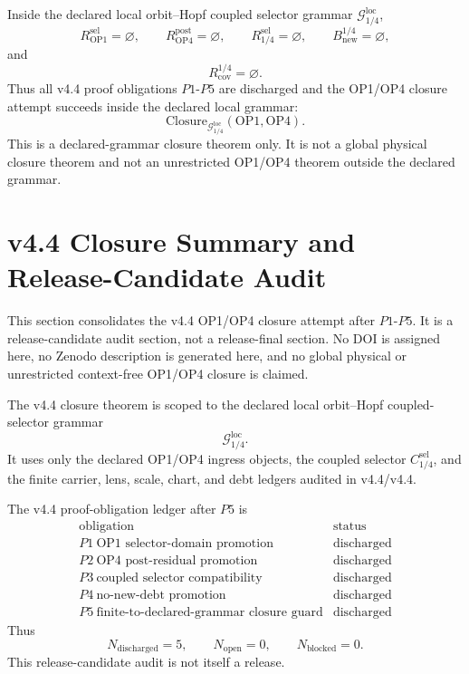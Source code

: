 \begin{theorem}
Inside the declared local orbit--Hopf coupled selector grammar
\(\mathcal G_{1/4}^{\mathrm{loc}}\),
\[
    R_{\mathrm{OP1}}^{\mathrm{sel}}=\varnothing,\qquad
    R_{\mathrm{OP4}}^{\mathrm{post}}=\varnothing,\qquad
    R_{1/4}^{\mathrm{sel}}=\varnothing,\qquad
    B_{\mathrm{new}}^{1/4}=\varnothing,
\]
and
\[
    R_{\mathrm{cov}}^{1/4}=\varnothing.
\]
Thus all v4.4 proof obligations \(P1\)-\(P5\) are discharged and the OP1/OP4
closure attempt succeeds inside the declared local grammar:
\[
    \mathrm{Closure}_{\mathcal G_{1/4}^{\mathrm{loc}}}(\mathrm{OP1},\mathrm{OP4}).
\]
This is a declared-grammar closure theorem only.  It is not a global physical
closure theorem and not an unrestricted OP1/OP4 theorem outside the declared
grammar.
\end{theorem}




\section{v4.4 Closure Summary and Release-Candidate Audit}
\label{sec:v45-closure-summary-release-candidate-audit}

This section consolidates the v4.4 OP1/OP4 closure attempt after \(P1\)-\(P5\).
It is a release-candidate audit section, not a release-final section.  No DOI
is assigned here, no Zenodo description is generated here, and no global
physical or unrestricted context-free OP1/OP4 closure is claimed.

\begin{definition}
The v4.4 closure theorem is scoped to the declared local orbit--Hopf
coupled-selector grammar
\[
    \mathcal G_{1/4}^{\mathrm{loc}}.
\]
It uses only the declared OP1/OP4 ingress objects, the coupled selector
\(C_{1/4}^{\mathrm{sel}}\), and the finite carrier, lens, scale, chart, and
debt ledgers audited in v4.4/v4.4.
\end{definition}

\begin{proposition}
The v4.4 proof-obligation ledger after \(P5\) is
\[
\begin{array}{c|c}
\text{obligation} & \text{status}\\
\hline
P1\ \text{OP1 selector-domain promotion} & \mathrm{discharged}\\
P2\ \text{OP4 post-residual promotion} & \mathrm{discharged}\\
P3\ \text{coupled selector compatibility} & \mathrm{discharged}\\
P4\ \text{no-new-debt promotion} & \mathrm{discharged}\\
P5\ \text{finite-to-declared-grammar closure guard} & \mathrm{discharged}
\end{array}
\]
Thus
\[
    N_{\mathrm{discharged}}=5,\qquad
    N_{\mathrm{open}}=0,\qquad
    N_{\mathrm{blocked}}=0.
\]
This release-candidate audit is not itself a release.
\end{proposition}

